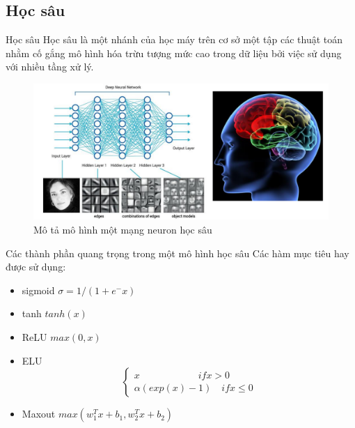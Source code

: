 \documentclass[compress]{beamer}
\begin{document}
\subsection{Học sâu}
\begin{frame}{Học sâu}
Học sâu là một nhánh của học máy trên cơ sở một tập các thuật toán nhằm cố gắng mô hình hóa trừu tượng mức cao trong dữ liệu bởi việc sử dụng với nhiều tầng xử lý. 
\begin{figure}[H]
\includegraphics[scale=0.3]{deeplearning.png}
\caption{Mô tả mô hình một mạng neuron học sâu}
\end{figure}
\end{frame}
\begin{frame}{Các thành phần quang trọng trong một mô hình học sâu} 
Các hàm mục tiêu hay được sử dụng: \begin{itemize}
\item sigmoid $\sigma =1/(1+e^-x)$
\item tanh $ tanh(x)$
\item ReLU $ max(0,x)$
\item ELU \abovedisplayskip=0pt\relax
\begin{equation}
\begin{cases}
x \qquad \qquad \qquad  if x>0\\ \alpha (exp(x)-1) \quad if x \leq 0
\end{cases}
\end{equation}
\item Maxout $max(w_1^T x+b_1,w_2^T x+b_2) $

\end{itemize}

\end{frame}
\end{document}
